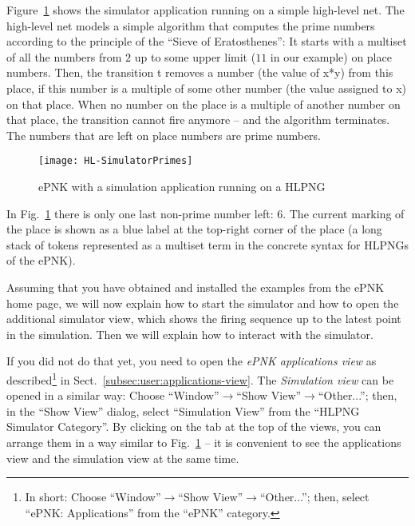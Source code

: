 Figure~\ref{fig:user:hl-simulator-1} shows the simulator application running
on a simple high-level net. The high-level net models a simple algorithm that
computes the prime numbers according to the principle of the ``Sieve of
Eratosthenes'':%
It starts with a multiset of all the numbers from $2$ up to some upper limit
($11$ in our example) on place {\sf numbers}. Then, the transition {\sf t}
removes a number (the value of {\sf x*y}) from this place, if this number is a
multiple of some other number (the value assigned to {\sf x}) on that place.
When no number on the place is a multiple of another number on that place, 
the transition cannot fire anymore -- and the algorithm terminates. The
numbers that are left on place {\sf numbers} are prime numbers.
%
\begin{figure}[hbt!!]
  \centerline{\texttt{[image: HL-SimulatorPrimes]}}
  \caption{ePNK with a simulation application running on a HLPNG}
  \label{fig:user:hl-simulator-1}
\end{figure}
%
In Fig.~\ref{fig:user:hl-simulator-1} there is only one last non-prime
number left: $6$. The current marking of the place is shown as a blue
label at the top-right corner of the place (a long stack of tokens
represented as a multiset term in the concrete syntax for HLPNGs of the
ePNK).

Assuming that you have obtained and installed the examples from the ePNK home
page, we will now explain how to start the simulator and how to open the
additional simulator view, which shows the firing sequence up to the latest
point in the simulation. Then we will explain how to interact with the simulator.

If you did not do that yet, you need to open the \emph{ePNK applications view}%
as described\footnote
  {In short:
   Choose ``Window''$\rightarrow$``Show View''$\rightarrow$``Other...'';
   then, select ``ePNK: Applications'' from the ``ePNK'' category.}
in Sect.~\ref{subsec:user:applications-view}. The \emph{Simulation view}%
can be opened in a similar way: Choose
``Window''$\rightarrow$``Show View''$\rightarrow$``Other...''; then, in
the ``Show View'' dialog, select ``Simulation View'' from the ``HLPNG
Simulator Category''. By clicking on the tab at the top of the views,
you can arrange them in a way similar to Fig.~\ref{fig:user:hl-simulator-1}
-- it is convenient to see the applications view and the simulation view
at the same time.

